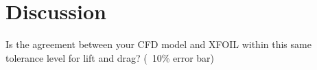 \section{Discussion}

Is the agreement between your CFD model and XFOIL within this same tolerance level for lift and drag? (~10\% error bar)